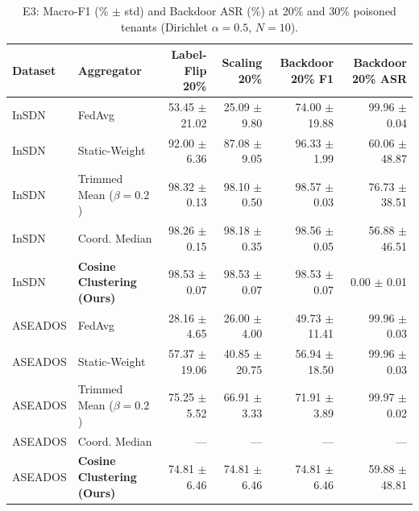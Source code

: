 \begin{table}[t]
\centering
\caption{E3: Macro-F1 (\% $\pm$ std) and Backdoor ASR (\%) at 20\% and 30\% poisoned tenants (Dirichlet $\alpha=0.5$, $N=10$).}
\label{tab:e3_poisoning}
\begin{tabular}{llrrrr}
\toprule
Dataset & Aggregator & Label-Flip 20\% & Scaling 20\% & Backdoor 20\% F1 & Backdoor 20\% ASR \\
\midrule
InSDN & FedAvg & 53.45 $\pm$ 21.02 & 25.09 $\pm$ 9.80 & 74.00 $\pm$ 19.88 & 99.96 $\pm$ 0.04 \\
InSDN & Static-Weight & 92.00 $\pm$ 6.36 & 87.08 $\pm$ 9.05 & 96.33 $\pm$ 1.99 & 60.06 $\pm$ 48.87 \\
InSDN & Trimmed Mean ($\beta=0.2$) & 98.32 $\pm$ 0.13 & 98.10 $\pm$ 0.50 & 98.57 $\pm$ 0.03 & 76.73 $\pm$ 38.51 \\
InSDN & Coord. Median & 98.26 $\pm$ 0.15 & 98.18 $\pm$ 0.35 & 98.56 $\pm$ 0.05 & 56.88 $\pm$ 46.51 \\
InSDN & \textbf{Cosine Clustering (Ours)} & 98.53 $\pm$ 0.07 & 98.53 $\pm$ 0.07 & 98.53 $\pm$ 0.07 & 0.00 $\pm$ 0.01 \\
\midrule
ASEADOS & FedAvg & 28.16 $\pm$ 4.65 & 26.00 $\pm$ 4.00 & 49.73 $\pm$ 11.41 & 99.96 $\pm$ 0.03 \\
ASEADOS & Static-Weight & 57.37 $\pm$ 19.06 & 40.85 $\pm$ 20.75 & 56.94 $\pm$ 18.50 & 99.96 $\pm$ 0.03 \\
ASEADOS & Trimmed Mean ($\beta=0.2$) & 75.25 $\pm$ 5.52 & 66.91 $\pm$ 3.33 & 71.91 $\pm$ 3.89 & 99.97 $\pm$ 0.02 \\
ASEADOS & Coord. Median & --- & --- & --- & --- \\
ASEADOS & \textbf{Cosine Clustering (Ours)} & 74.81 $\pm$ 6.46 & 74.81 $\pm$ 6.46 & 74.81 $\pm$ 6.46 & 59.88 $\pm$ 48.81 \\
\bottomrule
\end{tabular}
\end{table}
